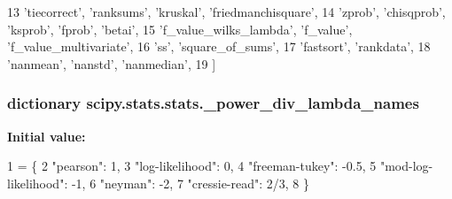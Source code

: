 \begin{DoxyVerb}
\begin{DoxyCode}
13            \textcolor{stringliteral}{'tiecorrect'}, \textcolor{stringliteral}{'ranksums'}, \textcolor{stringliteral}{'kruskal'}, \textcolor{stringliteral}{'friedmanchisquare'},
14            \textcolor{stringliteral}{'zprob'}, \textcolor{stringliteral}{'chisqprob'}, \textcolor{stringliteral}{'ksprob'}, \textcolor{stringliteral}{'fprob'}, \textcolor{stringliteral}{'betai'},
15            \textcolor{stringliteral}{'f\_value\_wilks\_lambda'}, \textcolor{stringliteral}{'f\_value'}, \textcolor{stringliteral}{'f\_value\_multivariate'},
16            \textcolor{stringliteral}{'ss'}, \textcolor{stringliteral}{'square\_of\_sums'},
17            \textcolor{stringliteral}{'fastsort'}, \textcolor{stringliteral}{'rankdata'},
18            \textcolor{stringliteral}{'nanmean'}, \textcolor{stringliteral}{'nanstd'}, \textcolor{stringliteral}{'nanmedian'},
19            ]
\end{DoxyCode}
\hypertarget{namespacescipy_1_1stats_1_1stats_a1170151fdd7757465759450c6990a85b}{}
\subsubsection[{\+\_\+power\+\_\+div\+\_\+lambda\+\_\+names}]{\setlength{\rightskip}{0pt plus 5cm}dictionary scipy.\+stats.\+stats.\+\_\+power\+\_\+div\+\_\+lambda\+\_\+names}\label{namespacescipy_1_1stats_1_1stats_a1170151fdd7757465759450c6990a85b}
{\bfseries Initial value\+:}
\begin{DoxyCode}
1 = \{
2     \textcolor{stringliteral}{"pearson"}: 1,
3     \textcolor{stringliteral}{"log-likelihood"}: 0,
4     \textcolor{stringliteral}{"freeman-tukey"}: -0.5,
5     \textcolor{stringliteral}{"mod-log-likelihood"}: -1,
6     \textcolor{stringliteral}{"neyman"}: -2,
7     \textcolor{stringliteral}{"cressie-read"}: 2/3,
8 \}
\end{DoxyCode}
\hypertarget{namespacescipy_1_1stats_1_1stats_a8c31dc4becce007349246d08a1456604}{}

\end{DoxyVerb}
